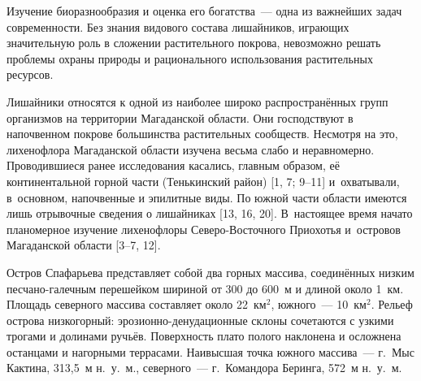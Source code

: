  

\makeProcTitle
{}

Изучение биоразнообразия и оценка его богатства~--- одна из важнейших задач современности. Без знания видового состава лишайников, играющих значительную роль в сложении растительного покрова, невозможно решать проблемы охраны природы и рационального использования растительных ресурсов.

Лишайники относятся к одной из наиболее широко распространённых групп организмов на территории Магаданской области. Они господствуют в напочвенном покрове большинства растительных сообществ. Несмотря на это, лихенофлора Магаданской области изучена весьма слабо и неравномерно. Проводившиеся ранее исследования касались, главным образом, её континентальной горной части (Тенькинский район) [1, 7; 9--11] и~охватывали, в~основном, напочвенные и эпилитные виды. По южной части области имеются лишь отрывочные сведения о лишайниках [13, 16, 20]. В~настоящее время начато планомерное изучение лихенофлоры Северо-Восточного Приохотья и~островов Магаданской области [3--7, 12].

Остров Спафарьева представляет собой два горных массива, соединённых низким пес\-ча\-но-галечным перешейком шириной от 300 до 600~м и длиной около 1~км. Площадь северного массива составляет около 22~км$^2$, южного~--- 10~км$^2$. Рельеф острова низкогорный: эрозионно-денудационные склоны сочетаются с узкими трогами и долинами ручьёв. Поверхность плато полого наклонена и осложнена останцами и нагорными террасами. Наивысшая точка южного массива~--- г.~Мыс Кактина, 313,5~м н.~у.~м., северного~--- г.~Командора Беринга, 572~м н.~у.~м.

